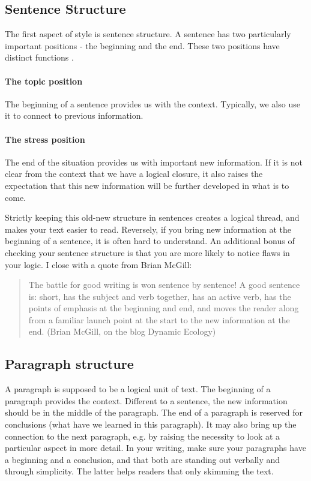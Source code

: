 \documentclass{tufte-book}
\begin{document}
\subsection{Sentence Structure}

The first aspect of style is sentence structure. A sentence has two particularly important positions - the  beginning and the end. These two positions have distinct functions \citep{Gopen-ScienceOfScientific-1990,Tischler-Scientificwritingbooklet-1978}.

\paragraph{The topic position} The beginning of a sentence provides us with the context. Typically, we also use it to connect to previous information.

\paragraph{The stress position} The end of the situation provides us with important new information. If it is not clear from the context that we have a logical closure, it also raises the expectation that this new information will be further developed in what is to come. 

Strictly keeping this old-new structure in sentences creates a logical thread, and makes your text easier to read. Reversely, if you bring new information at the beginning of a sentence, it is often hard to understand. An additional bonus of checking your sentence structure is that you are more likely to notice flaws in your logic. I close with a quote from Brian McGill:


\begin{quote}
The battle for good writing is won sentence by sentence! A good sentence is: short, has the subject and verb together, has an active verb, has the points of emphasis at the beginning and end, and moves the reader along from a familiar launch point at the start to the new information at the end. (Brian McGill, on the blog Dynamic Ecology)
\end{quote}


\subsection{Paragraph structure}

A paragraph is supposed to be a logical unit of text. The beginning of a paragraph provides the context. Different to a sentence, the new information should be in the middle of the paragraph. The end of a paragraph is reserved for conclusions (what have we learned in this paragraph). It may also bring up the connection to the next paragraph, e.g. by raising the necessity to look at a particular aspect in more detail. In your writing, make sure your paragraphs have a beginning and a conclusion, and that both are standing out verbally and through simplicity. The latter helps readers that only skimming the text. 
\end{document}
